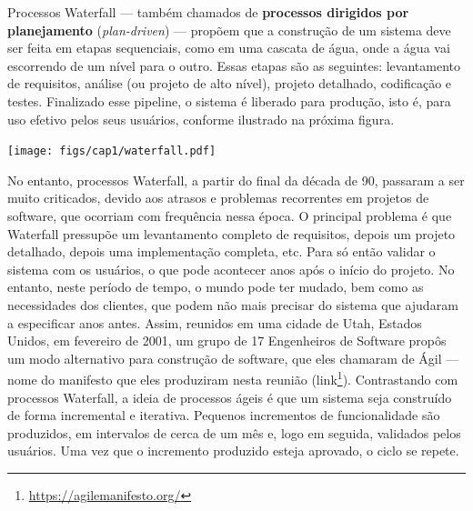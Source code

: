 \documentclass[
  11pt,
  twoside]{book}
\DeclareRobustCommand{\href}[2]{#2\footnote{\url{#1}}}
\let\origfigure\figure
\let\endorigfigure\endfigure
\renewenvironment{figure}[1][2] {
    \expandafter\origfigure\expandafter[!h]
} {
    \endorigfigure
}
\begin{document}
Processos Waterfall --- também chamados de \textbf{processos dirigidos
por planejamento} (\emph{plan-driven}) --- propõem que a construção de
um sistema deve ser feita em etapas sequenciais, como em uma cascata de
água, onde a água vai escorrendo de um nível para o outro. Essas etapas
são as seguintes: levantamento de requisitos, análise (ou projeto de
alto nível), projeto detalhado, codificação e testes. Finalizado esse
pipeline, o sistema é liberado para produção, isto é, para uso efetivo
pelos seus usuários, conforme ilustrado na próxima figura.

\begin{figure}
\centering
\texttt{[image: figs/cap1/waterfall.pdf]}
\caption{Fases de um processo Waterfall.}
\end{figure}

  No entanto, processos
Waterfall, a partir do final da década de 90, passaram a ser muito
criticados, devido aos atrasos e problemas recorrentes em projetos de
software, que ocorriam com frequência nessa época. O principal problema
é que Waterfall pressupõe um levantamento completo de requisitos, depois
um projeto detalhado, depois uma implementação completa, etc. Para só
então validar o sistema com os usuários, o que pode acontecer anos após
o início do projeto. No entanto, neste período de tempo, o mundo pode
ter mudado, bem como as necessidades dos clientes, que podem não mais
precisar do sistema que ajudaram a especificar anos antes. Assim,
reunidos em uma cidade de Utah, Estados Unidos, em fevereiro de 2001, um
grupo de 17 Engenheiros de Software propôs um modo alternativo para
construção de software, que eles chamaram de Ágil --- nome do manifesto
que eles produziram nesta reunião
(\href{https://agilemanifesto.org/}{link}). Contrastando com processos
Waterfall, a ideia de processos ágeis é que um sistema seja construído
de forma incremental e iterativa. Pequenos incrementos de funcionalidade
são produzidos, em intervalos de cerca de um mês e, logo em seguida,
validados pelos usuários. Uma vez que o incremento produzido esteja
aprovado, o ciclo se repete.
\end{document}
